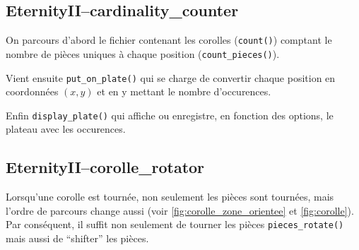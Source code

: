 	\subsection{EternityII--cardinality\_counter} 
	
On parcours d'abord le fichier contenant les corolles (\lstinline[language=python]|count()|) comptant le nombre de pièces uniques à chaque position (\lstinline[language=python]|count_pieces()|).

Vient ensuite \lstinline[language=python]|put_on_plate()| qui se charge de convertir chaque position en coordonnées $(x,y)$ et en y mettant le nombre d'occurences.

Enfin \lstinline[language=python]|display_plate()| qui affiche ou enregistre, en fonction des options, le plateau avec les occurences.

	\subsection{EternityII--corolle\_rotator}
	
Lorsqu'une corolle est tournée, non seulement les pièces sont tournées, mais l'ordre de parcours change aussi (voir \autoref{fig:corolle_zone_orientee} et \autoref{fig:corolle}). Par conséquent, il suffit non seulement de tourner les pièces \lstinline[language=python]|pieces_rotate()| mais aussi de \enquote{shifter} les pièces.

